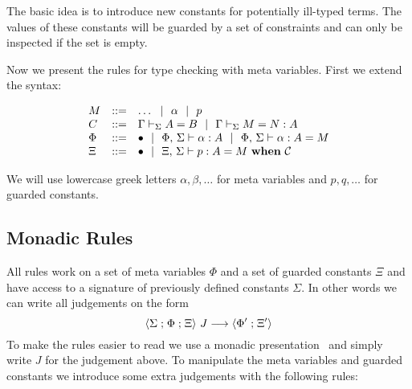 
The basic idea is to introduce new constants for potentially ill-typed terms.  
The values of these constants will be guarded by a set of constraints and can
only be inspected if the set is empty.

Now we present the rules for type checking with meta variables. First we extend
the syntax:

\[\begin{array}{lcll}
    M & ::= & \ldots ~~|~~ \alpha ~~|~~ p \\
    C & ::= & \Gamma\vdash_{\Sigma}A=B ~~|~~
	      \Gamma\vdash_{\Sigma}M=N:A \\
    \Phi & ::= & \bullet ~~|~~
		 {\Phi},\,{} {\Sigma} \vdash {\alpha} : {A} ~~|~~
		 {\Phi},\,{} {\Sigma} \vdash {\alpha} : {A} = {M} \\
    \Xi  & ::= & \bullet ~~|~~ {\Xi},\,{} {\Sigma} \vdash {p} : {A} = {M} ~\mathbf{when}~ {\mathcal{C}} \\
\end{array}\]

We will use lowercase greek letters $\alpha, \beta, \ldots$ for meta variables
and $p, q, \ldots$ for guarded constants.

\subsection{Monadic Rules}

All rules work on a set of meta variables $\Phi$ and a set of guarded constants
$\Xi$ and have access to a signature of previously defined constants $\Sigma$.
%
In other words we can write all judgements on the form
\[\langle {\Sigma} \mathrel ; {\Phi} \mathrel ; {\Xi} \rangle ~{J} \longrightarrow \langle {\Phi'} \mathrel ; {\Xi'} \rangle\]
%
To make the rules easier to read we use a monadic
presentation~\cite{monadicRules} and simply write $J$ for the judgement above.
%
To manipulate the meta variables and guarded
constants we introduce some extra judgements with the following rules:




